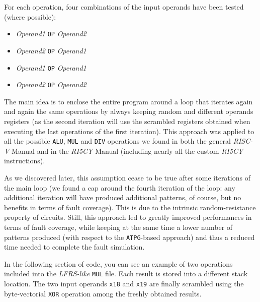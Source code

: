 \documentclass{article}
\begin{document}
For each operation, four combinations of the input operands have been tested (where possible):

\begin{itemize}
    \item \emph{Operand1} \texttt{OP} \emph{Operand2}
    \item \emph{Operand2} \texttt{OP} \emph{Operand1}
    \item \emph{Operand1} \texttt{OP} \emph{Operand1}
    \item \emph{Operand2} \texttt{OP} \emph{Operand2}
\end{itemize}

The main idea is to enclose the entire program around a loop that iterates again and again the same operations by always keeping random and different operands registers (as the second iteration will use the scrambled registers obtained when executing the last operations of the first iteration). This approach was applied to all the possible \texttt{ALU}, \texttt{MUL} and \texttt{DIV} operations we found in both the general \emph{RISC-V} Manual and in the \emph{RI5CY} Manual (including nearly-all the custom \emph{RI5CY} instructions).

As we discovered later, this assumption cease to be true after some iterations of the main loop (we found a cap around the fourth iteration of the loop: any additional iteration will have produced additional patterns, of course, but no benefits in terms of fault coverage). This is due to the intrinsic random-resistance property of circuits. Still, this approach led to greatly improved performances in terms of fault coverage, while keeping at the same time a lower number of patterns produced (with respect to the \texttt{ATPG}-based approach) and thus a reduced time needed to complete the fault simulation.

In the following section of code, you can see an example of two operations included into the \emph{LFRS-like} \texttt{MUL} file. Each result is stored into a different stack location. The two input operands \texttt{x18} and \texttt{x19} are finally scrambled using the byte-vectorial \texttt{XOR} operation among the freshly obtained results.
\end{document}
